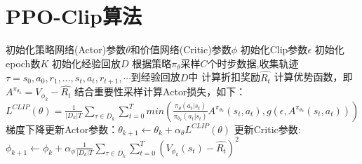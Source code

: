 \documentclass[11pt]{ctexart}
\begin{document}
\section{PPO-Clip算法}
\begin{algorithm}[H] %
	\renewcommand{\thealgorithm}{} %
	\caption{} 
	\begin{algorithmic}[1] %
		\STATE 初始化策略网络(Actor)参数$\theta$和价值网络(Critic)参数$\phi$
		\STATE 初始化Clip参数$\epsilon$
		\STATE 初始化epoch数$K$
		\STATE 初始化经验回放$D$
			\STATE 根据策略$\pi_{\theta}$采样$C$个时步数据,收集轨迹$\tau = {s_0,a_0,r_1,...,s_t,a_t,r_{t+1},\cdots}$到经验回放$D$中
				\STATE 计算折扣奖励$\hat{R_t}$
				\STATE 计算优势函数，即$A^{\pi_{\theta_{k}}}=V_{\phi_k}-\hat{R_t}$
				\STATE 结合重要性采样计算Actor损失，如下：
				\STATE $L^{CLIP}(\theta)= \frac{1}{|D_k|T}\sum_{\tau \in D_k}\sum_{t=0}^{T} min(\frac{\pi_\theta(a_t|s_t)}{\pi_{\theta_{k}}(a_t|s_t)} A^{\pi_{\theta_{k}}}(s_t,a_t), g(\epsilon,A^{\pi_{\theta_{k}}}(s_t,a_t)))$\footnotemark[3]
				\STATE 梯度下降更新Actor参数：$\theta_{k+1} \leftarrow \theta_{k} + \alpha_{\theta} L^{CLIP}(\theta)$
				\STATE 更新Critic参数:
				\STATE $\phi_{k+1} \leftarrow \phi_{k}+ \alpha_{\phi}\frac{1}{|D_k|T}\sum_{\tau \in D_k}\sum_{t=0}^{T} (V_{\phi_{k}}(s_t)-\hat{R_t})^2$
			\ENDFOR
		\ENDFOR
	\end{algorithmic}
\end{algorithm}
\clearpage
\end{document}
